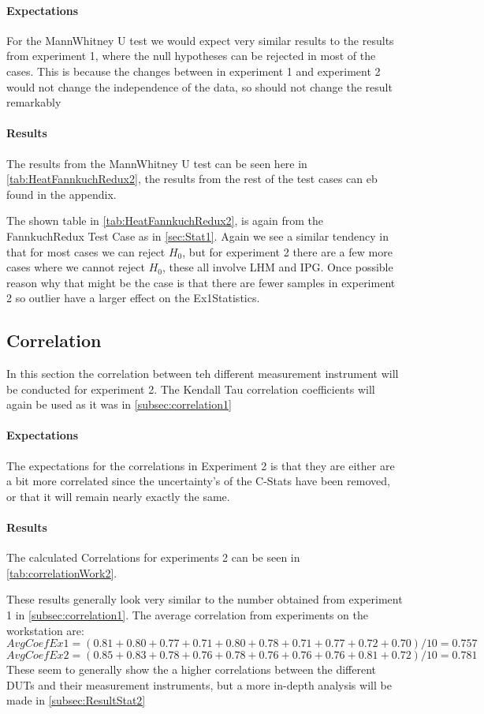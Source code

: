 \paragraph{Expectations}
For the MannWhitney U test we would expect very similar results to the results from experiment 1, where the null hypotheses can be rejected in most of the cases. This is because the changes between in experiment 1 and experiment 2 would not change the independence of the data, so should not change the result remarkably

\paragraph{Results}
The results from the MannWhitney U test can be seen here in \cref{tab:HeatFannkuchRedux2}, the results from the rest of the test cases can eb found in the appendix.

The shown table in \cref{tab:HeatFannkuchRedux2}, is again from the FannkuchRedux Test Case as in \cref{sec:Stat1}. Again we see a similar tendency in that for most cases we can reject $H_0$, but for experiment 2 there are a few more cases where we cannot reject $H_0$, these all involve LHM and IPG. Once possible reason why that might be the case is that there are fewer samples in experiment 2 so outlier have a larger effect on the Ex1Statistics.

\subsection{Correlation}\label{subsec:correlation2}
In this section the correlation between teh different measurement instrument will be conducted for experiment 2. The Kendall Tau correlation coefficients will again be used as it was in \cref{subsec:correlation1}

\paragraph{Expectations}
The expectations for the correlations in Experiment 2 is that they are either are a bit more correlated since the uncertainty's of the C-Stats have been removed, or that it will remain nearly exactly the same.
\paragraph{Results}
The calculated Correlations for experiments 2 can be seen in \cref{tab:correlationWork2}.

These results generally look very similar to the number obtained from experiment 1 in \cref{subsec:correlation1}. 
The average correlation from experiments on the workstation are:
$$AvgCoefEx1 = (0.81+0.80+0.77+0.71+0.80+0.78+0.71+0.77+0.72+0.70)/10 = 0.757$$
$$AvgCoefEx2 = (0.85+0.83+0.78+0.76+0.78+0.76+0.76+0.76+0.81+0.72)/10 = 0.781$$
These seem to generally show the a higher correlations between the different DUTs and their measurement instruments, but a more in-depth analysis will be made in \cref{subsec:ResultStat2}

